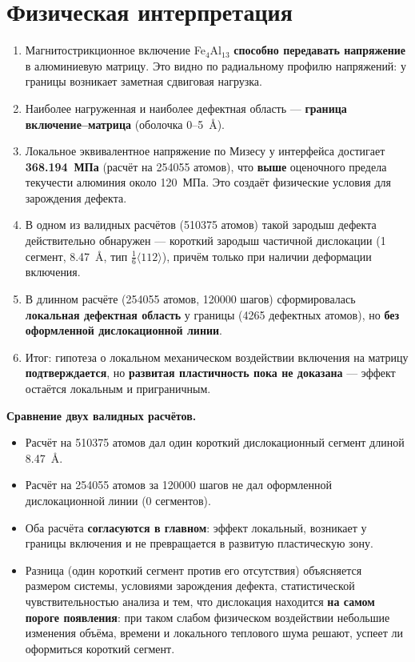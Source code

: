 \documentclass[12pt,a4paper]{extarticle}
\begin{document}
\section{Физическая интерпретация}
\begin{enumerate}[leftmargin=1.6em,itemsep=3pt,topsep=2pt]
\item Магнитострикционное включение Fe$_4$Al$_{13}$ \textbf{способно передавать напряжение} в алюминиевую матрицу. Это видно по радиальному профилю напряжений: у границы возникает заметная сдвиговая нагрузка.
\item Наиболее нагруженная и наиболее дефектная область — \textbf{граница включение--матрица} (оболочка 0--5~Å).
\item Локальное эквивалентное напряжение по Мизесу у интерфейса достигает \textbf{368.194~МПа} (расчёт на 254055 атомов), что \textbf{выше} оценочного предела текучести алюминия около 120~МПа. Это создаёт физические условия для зарождения дефекта.
\item В одном из валидных расчётов (510375 атомов) такой зародыш дефекта действительно обнаружен — короткий зародыш частичной дислокации (1 сегмент, 8.47~Å, тип $\tfrac{1}{6}\langle 112\rangle$), причём только при наличии деформации включения.
\item В длинном расчёте (254055 атомов, 120000 шагов) сформировалась \textbf{локальная дефектная область} у границы (4265 дефектных атомов), но \textbf{без оформленной дислокационной линии}.
\item Итог: гипотеза о локальном механическом воздействии включения на матрицу \textbf{подтверждается}, но \textbf{развитая пластичность пока не доказана} — эффект остаётся локальным и приграничным.
\end{enumerate}

\smallskip
\noindent\textbf{Сравнение двух валидных расчётов.}
\begin{itemize}[leftmargin=1.4em,itemsep=2pt,topsep=2pt]
\item Расчёт на 510375 атомов дал один короткий дислокационный сегмент длиной 8.47~Å.
\item Расчёт на 254055 атомов за 120000 шагов не дал оформленной дислокационной линии (0 сегментов).
\item Оба расчёта \textbf{согласуются в главном}: эффект локальный, возникает у границы включения и не превращается в развитую пластическую зону.
\item Разница (один короткий сегмент против его отсутствия) объясняется размером системы, условиями зарождения дефекта, статистической чувствительностью анализа и тем, что дислокация находится \textbf{на самом пороге появления}: при таком слабом физическом воздействии небольшие изменения объёма, времени и локального теплового шума решают, успеет ли оформиться короткий сегмент.
\end{itemize}
\end{document}
